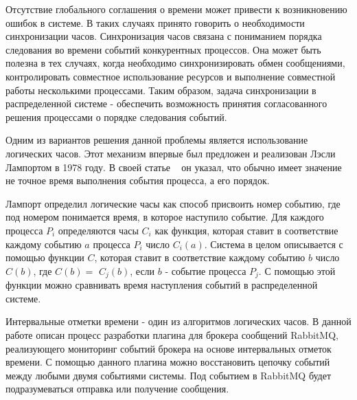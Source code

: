 





\Intro

Отсутствие глобального соглашения о времени может привести к возникновению ошибок в системе. В таких случаях принято говорить о необходимости синхронизации часов.
Синхронизация часов связана с пониманием порядка следования во времени событий конкурентных процессов. Она может быть полезна в тех случаях, когда необходимо синхронизировать обмен сообщениями, контролировать совместное использование ресурсов и выполнение совместной работы несколькими процессами. Таким образом, задача синхронизации в распределенной системе - обеспечить возможность принятия согласованного решения процессами о порядке следования событий. \par
Одним из вариантов решения данной проблемы является использование логических часов. Этот механизм впервые был предложен и реализован Лэсли Лампортом в 1978 году.
В своей статье ~\cite{lamport} он указал, что обычно имеет значение не точное время выполнения события процесса, а его порядок. \par
Лампорт определил логические часы как способ присвоить номер событию, где под номером понимается время, в которое наступило событие. Для каждого процесса $P_i$ определяются часы $C_i$ как функция, которая ставит в соответствие каждому событию $a$ процесса $P_i$ число  $C_i(a)$. Система в целом описывается с помощью функции $C$, которая ставит в соответствие каждому событию $b$ число $C(b)$, 
где $C(b)=$ $C_j(b)$, если $b$ - событие процесса $P_j$. С помощью этой функции можно сравнивать время наступления событий в распределенной системе.\par
Интервальные отметки времени - один из алгоритмов логических часов.  
В данной работе описан процесс разработки плагина для брокера сообщений RabbitMQ, реализующего мониторинг событий брокера на основе интервальных отметок времени. С помощью данного плагина можно восстановить цепочку событий между любыми двумя событиями системы. Под событием в RabbitMQ будет подразумеваться отправка или получение сообщения. 
\newpage


